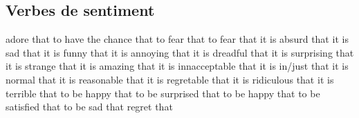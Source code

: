 \subsection*{Verbes de sentiment}

   {adore that}
   {to have the chance that}
   {to fear that}
   {to fear that}
   {it is absurd that}
   {it is sad that}
   {it is funny that}
   {it is annoying that}
   {it is dreadful that}
   {it is surprising that}
   {it is strange that}
   {it is amazing that}
   {it is innacceptable that}
   {it is in/just that}
   {it is normal that}
   {it is reasonable that}
   {it is regretable that}
   {it is ridiculous that}
   {it is terrible that}
   {to be happy that}
   {to be surprised that}
   {to be happy that}
   {to be satisfied that}
   {to be sad that}
   {regret that}
